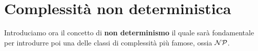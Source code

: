 \chapter{Complessità non deterministica}

Introduciamo ora il concetto di \textbf{non determinismo} il
quale sarà fondamentale per introdurre poi una delle classi
di complessità più famose, ossia $\mathcal{NP}$.